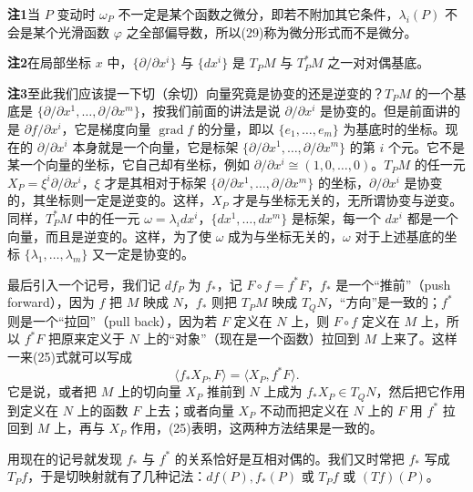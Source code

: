 \noindent\textbf{注1}\quad 当 $P$ 变动时 $\omega_P$ 不一定是某个函数之微分，即若不附加其它条件，$\lambda_i(P)$ 不会是某个光滑函数 $\varphi$ 之全部偏导数，所以(29)称为微分形式而不是微分。

\noindent\textbf{注2}\quad 在局部坐标 $x$ 中，$\{\partial/\partial x^i\}$ 与 $\{dx^i\}$ 是 $T_PM$ 与 $T_P^*M$ 之一对对偶基底。

\noindent\textbf{注3}\quad 至此我们应该提一下切（余切）向量究竟是协变的还是逆变的？$T_PM$ 的一个基底是 $\{\partial/\partial x^1,\ldots,\partial/\partial x^m\}$，按我们前面的讲法是说 $\partial/\partial x^i$ 是协变的。但是前面讲的是 $\partial f/\partial x^i$，它是梯度向量 $\operatorname{grad}f$ 的分量，即以 $\{e_1,\ldots,e_m\}$ 为基底时的坐标。现在的 $\partial/\partial x^i$ 本身就是一个向量，它是标架 $\{\partial/\partial x^1,\ldots,\partial/\partial x^m\}$ 的第 $i$ 个元。它不是某一个向量的坐标，它自己却有坐标，例如 $\partial/\partial x^i\cong(1,0,\ldots,0)$。$T_PM$ 的任一元 $X_P=\xi^i\partial/\partial x^i$，$\xi$ 才是其相对于标架 $\{\partial/\partial x^1,\ldots,\partial/\partial x^m\}$ 的坐标，$\partial/\partial x^i$ 是协变的，其坐标则一定是逆变的。这样，$X_P$ 才是与坐标无关的，无所谓协变与逆变。同样，$T_P^*M$ 中的任一元 $\omega=\lambda_i dx^i$，$\{dx^1,\ldots,dx^m\}$ 是标架，每一个 $dx^i$ 都是一个向量，而且是逆变的。这样，为了使 $\omega$ 成为与坐标无关的，$\omega$ 对于上述基底的坐标 $\{\lambda_1,\ldots,\lambda_m\}$ 又一定是协变的。

最后引入一个记号，我们记 $df_P$ 为 $f_*$，记 $F\circ f=f^*F$，$f_*$ 是一个“推前”（push forward），因为 $f$ 把 $M$ 映成 $N$，$f_*$ 则把 $T_PM$ 映成 $T_QN$，“方向”是一致的；$f^*$ 则是一个“拉回”（pull back），因为若 $F$ 定义在 $N$ 上，则 $F\circ f$ 定义在 $M$ 上，所以 $f^*F$ 把原来定义于 $N$ 上的“对象”（现在是一个函数）拉回到 $M$ 上来了。这样一来(25)式就可以写成
\[
 \langle f_*X_P,F\rangle=\langle X_P,f^*F\rangle.
\]
它是说，或者把 $M$ 上的切向量 $X_P$ 推前到 $N$ 上成为 $f_*X_P\in T_QN$，然后把它作用到定义在 $N$ 上的函数 $F$ 上去；或者向量 $X_P$ 不动而把定义在 $N$ 上的 $F$ 用 $f^*$ 拉回到 $M$ 上，再与 $X_P$ 作用，(25)表明，这两种方法结果是一致的。

用现在的记号就发现 $f_*$ 与 $f^*$ 的关系恰好是互相对偶的。我们又时常把 $f_*$ 写成 $T_Pf$，于是切映射就有了几种记法：$df(P),f_*(P)$ 或 $T_Pf$ 或 $(Tf)(P)$。

